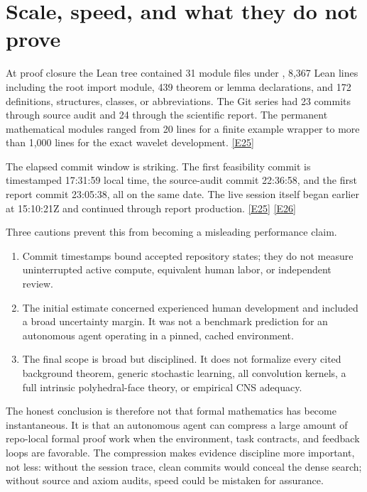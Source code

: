 \documentclass[11pt,a4paper]{article}
\newcommand{\artifact}[1]{\texttt{\detokenize{#1}}}
\newcommand{\ev}[1]{%
  \hyperref[ev:#1]{\textcolor{ReportBlue}{\textsf{\scriptsize[#1]}}}}
\begin{document}
\section{Scale, speed, and what they do not prove}
\label{sec:scale}

At proof closure the Lean tree contained 31 module files under
\artifact{IPNPCNS/}, 8,367 Lean lines including the root import module, 439 theorem or
lemma declarations, and 172 definitions, structures, classes, or abbreviations. The
Git series had 23 commits through source audit and 24 through the scientific report.
The permanent mathematical modules ranged from 20 lines for a finite example wrapper
to more than 1,000 lines for the exact wavelet development. \ev{E25}

The elapsed commit window is striking. The first feasibility commit is timestamped
17:31:59 local time, the source-audit commit 22:36:58, and the first report commit
23:05:38, all on the same date. The live session itself began earlier at 15:10:21Z
and continued through report production. \ev{E25}\ev{E26}

Three cautions prevent this from becoming a misleading performance claim.

\begin{enumerate}[label=\arabic*.]
  \item Commit timestamps bound accepted repository states; they do not measure
    uninterrupted active compute, equivalent human labor, or independent review.
  \item The initial estimate concerned experienced human development and included a
    broad uncertainty margin. It was not a benchmark prediction for an autonomous
    agent operating in a pinned, cached environment.
  \item The final scope is broad but disciplined. It does not formalize every cited
    background theorem, generic stochastic learning, all convolution kernels, a full
    intrinsic polyhedral-face theory, or empirical CNS adequacy.
\end{enumerate}

The honest conclusion is therefore not that formal mathematics has become
instantaneous. It is that an autonomous agent can compress a large amount of
repo-local formal proof work when the environment, task contracts, and feedback
loops are favorable. The compression makes evidence discipline more important, not
less: without the session trace, clean commits would conceal the dense search; without
source and axiom audits, speed could be mistaken for assurance.
\end{document}
